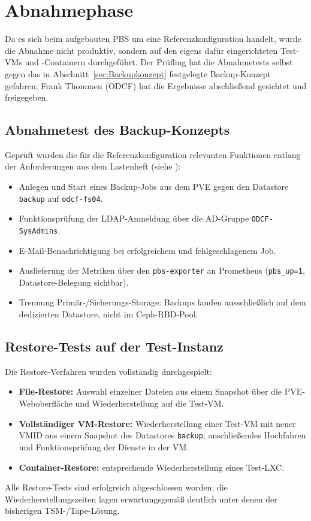 \section{Abnahmephase}
\label{sec:Abnahmephase}

Da es sich beim aufgebauten \ac{PBS} um eine Referenzkonfiguration
handelt, wurde die Abnahme nicht produktiv, sondern auf den
eigens dafür eingerichteten Test-\acp{VM} und -Containern
durchgeführt. Der Prüfling hat die Abnahmetests selbst gegen das
in Abschnitt~\ref{sec:Backupkonzept} festgelegte Backup-Konzept
gefahren; Frank Thommen (\ac{ODCF}) hat die Ergebnisse abschließend
gesichtet und freigegeben.

\subsection{Abnahmetest des Backup-Konzepts}
Geprüft wurden die für die Referenzkonfiguration relevanten Funktionen entlang
der Anforderungen aus dem Lastenheft (siehe ):
\begin{itemize}\setlength{\itemsep}{1pt}
    \item Anlegen und Start eines Backup-Jobs aus dem \ac{PVE}
          gegen den Datastore \texttt{backup} auf
          \texttt{odcf-fs04}.
    \item Funktionsprüfung der \ac{LDAP}-Anmeldung über die
          \ac{AD}-Gruppe \texttt{ODCF-SysAdmins}.
    \item E-Mail-Benachrichtigung bei erfolgreichem und
          fehlgeschlagenem Job.
    \item Auslieferung der Metriken über den
          \texttt{pbs-exporter} an Prometheus
          (\texttt{pbs\_up=1}, Datastore-Belegung sichtbar).
    \item Trennung Primär-/Sicherungs-Storage: Backups landen
          ausschließlich auf dem dedizierten Datastore, nicht im
          Ceph-\ac{RBD}-Pool.
\end{itemize}

\subsection{Restore-Tests auf der Test-Instanz}
Die Restore-Verfahren wurden vollständig durchgespielt:
\begin{itemize}\setlength{\itemsep}{1pt}
    \item \textbf{File-Restore:} Auswahl einzelner Dateien aus einem
          Snapshot über die \ac{PVE}-Weboberfläche und
          Wiederherstellung auf die Test-\ac{VM}.
    \item \textbf{Vollständiger \ac{VM}-Restore:} Wiederherstellung
          einer Test-\ac{VM} mit neuer VMID aus einem Snapshot des
          Datastores \texttt{backup}; anschließendes Hochfahren und
          Funktionsprüfung der Dienste in der \ac{VM}.
    \item \textbf{Container-Restore:} entsprechende
          Wiederherstellung eines Test-\ac{LXC}.
\end{itemize}
Alle Restore-Tests sind erfolgreich abgeschlossen worden; die
Wiederherstellungszeiten lagen erwartungsgemäß deutlich unter
denen der bisherigen \ac{TSM}-/Tape-Lösung.

